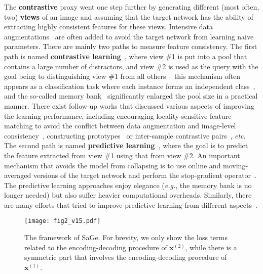 \documentclass[10pt,twocolumn,letterpaper]{article}
\begin{document}
The \textbf{contrastive} proxy went one step further by generating different (most often, two) \textbf{views} of an image and assuming that the target network has the ability of extracting highly consistent features for these views. Intensive data augmentations~\cite{bachman2019learning,misra2020self} are often added to avoid the target network from learning naive parameters. There are mainly two paths to measure feature consistency. The first path is named \textbf{contrastive learning}~\cite{he2020momentum,wu2018unsupervised,zhuang2019local,oord2018representation,bachman2019learning,chen2020simple}, where view \#1 is put into a pool that contains a large number of distractors, and view \#2 is used as the query with the goal being to distinguishing view \#1 from all others -- this mechanism often appears as a classification task where each instance forms an independent class~\cite{dosovitskiy2015discriminative}, and the so-called memory bank~\cite{wu2018unsupervised,he2020momentum} significantly enlarged the pool size in a practical manner. There exist follow-up works that discussed various aspects of improving the learning performance, including encouraging locality-sensitive feature matching to avoid the conflict between data augmentation and image-level consistency~\cite{wang2021dense,li2021efficient,xie2021detco}, constructing prototypes~\cite{li2020prototypical,caron2020unsupervised} or inter-sample contrastive pairs~\cite{chen2020simple}, \textit{etc}. The second path is named \textbf{predictive learning}~\cite{grill2020bootstrap}, where the goal is to predict the feature extracted from view \#1 using that from view \#2. An important mechanism that avoids the model from collapsing is to use online and moving-averaged versions of the target network and perform the stop-gradient operator~\cite{grill2020bootstrap,chen2021exploring}. The predictive learning approaches enjoy elegance (\textit{e.g.}, the memory bank is no longer needed) but also suffer heavier computational overheads. Similarly, there are many efforts that tried to improve predictive learning from different aspects~\cite{tejankar2021isd,koohpayegani2021mean,zbontar2021barlow}.

\begin{figure*}\begin{center}
\texttt{[image: fig2\_v15.pdf]}
\end{center}
\caption{The framework of SaGe. For brevity, we only show the loss terms related to the encoding-decoding procedure of $\mathbf{x}^{(2)}$, while there is a symmetric part that involves the encoding-decoding procedure of $\mathbf{x}^{(1)}$.}
\label{fig:framework}
\end{figure*}
\end{document}

